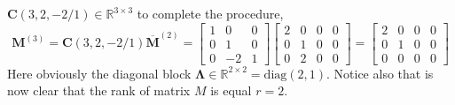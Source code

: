 \begin{example}
			$\bm{C}(3,2,-2/1)\in\mathbb{R}^{3\times 3}$ to complete the procedure,
			\begin{equation}
				\bm{M}^{(3)} = \bm{C}(3,2,-2/1)\overline{\bm{M}}^{(2)} = 
				\begin{bmatrix}
					1 & 0  & 0 \\
					0 & 1  & 0 \\
					0 & -2 & 1
				\end{bmatrix}
				\begin{bmatrix}
					2 & 0 & 0 & 0 \\
					0 & 1 & 0 & 0 \\
					0 & 2 & 0 & 0 
				\end{bmatrix}
				= 
				\begin{bmatrix}
					2 & 0 & 0 & 0 \\
					0 & 1 & 0 & 0 \\
					0 & 0 & 0 & 0 
				\end{bmatrix}
			\end{equation}
			Here obviously the diagonal block 
			$\bm{\Lambda}\in\mathbb{R}^{2\times 2} = \textrm{diag}(2,1)$.
			Notice also that is now clear that the rank of matrix $M$ is equal $r = 2$.
		\end{example}
